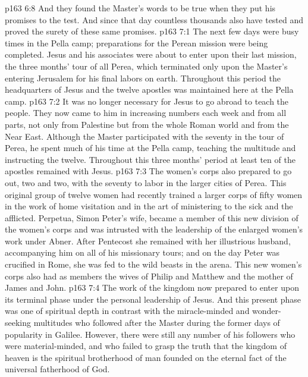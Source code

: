 \vs p163 6:8 \pc And they found the Master’s words to be true when they put his promises to the test. And since that day countless thousands also have tested and proved the surety of these same promises.
\vs p163 7:1 The next few days were busy times in the Pella camp; preparations for the Perean mission were being completed. Jesus and his associates were about to enter upon their last mission, the three months’ tour of all Perea, which terminated only upon the Master’s entering Jerusalem for his final labors on earth. Throughout this period the headquarters of Jesus and the twelve apostles was maintained here at the Pella camp.
\vs p163 7:2 It was no longer necessary for Jesus to go abroad to teach the people. They now came to him in increasing numbers each week and from all parts, not only from Palestine but from the whole Roman world and from the Near East. Although the Master participated with the seventy in the tour of Perea, he spent much of his time at the Pella camp, teaching the multitude and instructing the twelve. Throughout this three months’ period at least ten of the apostles remained with Jesus.
\vs p163 7:3 The women’s corps also prepared to go out, two and two, with the seventy to labor in the larger cities of Perea. This original group of twelve women had recently trained a larger corps of fifty women in the work of home visitation and in the art of ministering to the sick and the afflicted. Perpetua, Simon Peter’s wife, became a member of this new division of the women’s corps and was intrusted with the leadership of the enlarged women’s work under Abner. After Pentecost she remained with her illustrious husband, accompanying him on all of his missionary tours; and on the day Peter was crucified in Rome, she was fed to the wild beasts in the arena. This new women’s corps also had as members the wives of Philip and Matthew and the mother of James and John.
\vs p163 7:4 The work of the kingdom now prepared to enter upon its terminal phase under the personal leadership of Jesus. And this present phase was one of spiritual depth in contrast with the miracle\hyp{}minded and wonder\hyp{}seeking multitudes who followed after the Master during the former days of popularity in Galilee. However, there were still any number of his followers who were material\hyp{}minded, and who failed to grasp the truth that the kingdom of heaven is the spiritual brotherhood of man founded on the eternal fact of the universal fatherhood of God.
